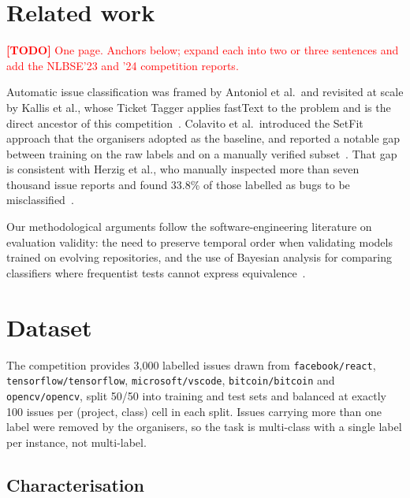 \documentclass[10pt,a4paper]{article}
\newcommand{\todoitem}[1]{\textcolor{red}{\textbf{[TODO]} #1}}
\begin{document}
\section{Related work}
\label{sec:related}

\todoitem{One page. Anchors below; expand each into two or three sentences and
add the NLBSE'23 and '24 competition reports.}

Automatic issue classification was framed by Antoniol et al.\ and revisited at
scale by Kallis et al., whose Ticket Tagger applies fastText to the problem and
is the direct ancestor of this competition~\cite{kallis2019tickettagger}.
Colavito et al.\ introduced the SetFit approach that the organisers adopted as
the baseline, and reported a notable gap between training on the raw labels and
on a manually verified subset~\cite{colavito2023fewshot}. That gap is
consistent with Herzig et al., who manually inspected more than seven thousand
issue reports and found 33.8\% of those labelled as bugs to be
misclassified~\cite{herzig2013misclassification}.

Our methodological arguments follow the software-engineering literature on
evaluation validity: the need to preserve temporal order when validating
models trained on evolving repositories, and the use of Bayesian analysis for
comparing classifiers where frequentist tests cannot express
equivalence~\cite{benavoli2017bayesian}.

\section{Dataset}
\label{sec:dataset}

The competition provides 3{,}000 labelled issues drawn from
\texttt{facebook/react}, \texttt{tensorflow/tensorflow},
\texttt{microsoft/vscode}, \texttt{bitcoin/bitcoin} and
\texttt{opencv/opencv}, split 50/50 into training and test sets and balanced at
exactly 100 issues per (project, class) cell in each split. Issues carrying
more than one label were removed by the organisers, so the task is multi-class
with a single label per instance, not multi-label.



\subsection{Characterisation}
\end{document}
